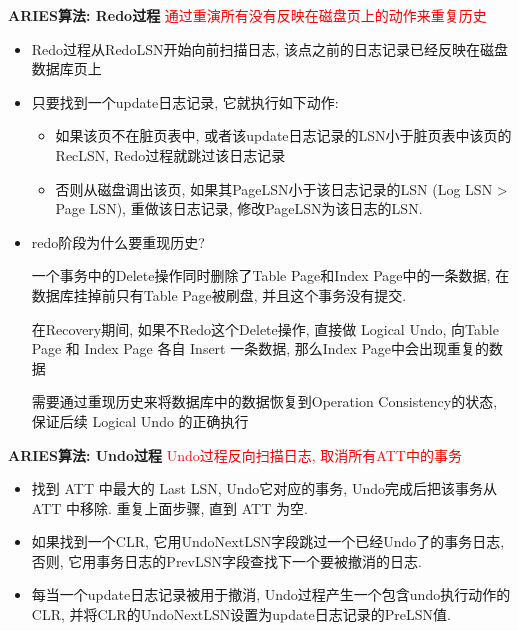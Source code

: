\textbf{ARIES算法: Redo过程} \textcolor{red}{通过重演所有没有反映在磁盘页上的动作来重复历史}
\begin{itemize}
    \item Redo过程从RedoLSN开始向前扫描日志, 该点之前的日志记录已经反映在磁盘数据库页上
    \item 只要找到一个update日志记录, 它就执行如下动作:
    \begin{itemize}
        \item 如果该页不在脏页表中, 或者该update日志记录的LSN小于脏页表中该页的RecLSN, Redo过程就跳过该日志记录
        \item 否则从磁盘调出该页, 如果其PageLSN小于该日志记录的LSN (Log LSN > Page LSN), 重做该日志记录, 修改PageLSN为该日志的LSN.
    \end{itemize}
    \item redo阶段为什么要重现历史?

    一个事务中的Delete操作同时删除了Table Page和Index Page中的一条数据, 在数据库挂掉前只有Table Page被刷盘, 并且这个事务没有提交.

    在Recovery期间, 如果不Redo这个Delete操作, 直接做 Logical Undo, 向Table Page 和 Index Page 各自 Insert 一条数据, 那么Index Page中会出现重复的数据

    需要通过重现历史来将数据库中的数据恢复到Operation Consistency的状态, 保证后续 Logical Undo 的正确执行
\end{itemize}

\textbf{ARIES算法: Undo过程} \textcolor{red}{Undo过程反向扫描日志, 取消所有ATT中的事务}
\begin{itemize}
    \item 找到 ATT 中最大的 Last LSN, Undo它对应的事务, Undo完成后把该事务从 ATT 中移除. 重复上面步骤, 直到 ATT 为空.
    \item 如果找到一个CLR, 它用UndoNextLSN字段跳过一个已经Undo了的事务日志, 否则, 它用事务日志的PrevLSN字段查找下一个要被撤消的日志.
    \item 每当一个update日志记录被用于撤消, Undo过程产生一个包含undo执行动作的CLR, 并将CLR的UndoNextLSN设置为update日志记录的PreLSN值.
\end{itemize}



